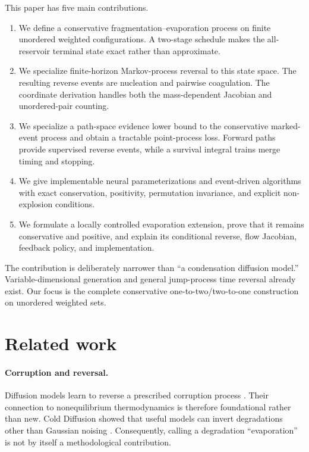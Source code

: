 \documentclass[10pt]{article}
\theoremstyle{definition}
\theoremstyle{remark}
\begin{document}
This paper has five main contributions.
\begin{enumerate}
  \item We define a conservative fragmentation--evaporation process on finite unordered weighted configurations.  A two-stage schedule makes the all-reservoir terminal state exact rather than approximate.
  \item We specialize finite-horizon Markov-process reversal to this state
  space.  The resulting reverse events are nucleation and pairwise
  coagulation.  The coordinate derivation handles both the mass-dependent
  Jacobian and unordered-pair counting.
  \item We specialize a path-space evidence lower bound to the conservative
  marked-event process and obtain a tractable point-process loss.  Forward
  paths provide supervised reverse events, while a survival integral trains
  merge timing and stopping.
  \item We give implementable neural parameterizations and event-driven algorithms with exact conservation, positivity, permutation invariance, and explicit non-explosion conditions.
  \item We formulate a locally controlled evaporation extension, prove that
  it remains conservative and positive, and explain its conditional reverse,
  flow Jacobian, feedback policy, and implementation.
\end{enumerate}

The contribution is deliberately narrower than ``a condensation diffusion model.''  Variable-dimensional generation and general jump-process time reversal already exist.  Our focus is the complete conservative one-to-two/two-to-one construction on unordered weighted sets.

\section{Related work}

\paragraph{Corruption and reversal.}
Diffusion models learn to reverse a prescribed corruption process
\cite{sohldickstein2015deep,ho2020denoising,song2021score}.  Their connection to nonequilibrium thermodynamics is therefore foundational rather than new.  Cold Diffusion showed that useful models can invert degradations other than Gaussian noising \cite{bansal2023cold}.  Consequently, calling a degradation ``evaporation'' is not by itself a methodological contribution.
\end{document}
